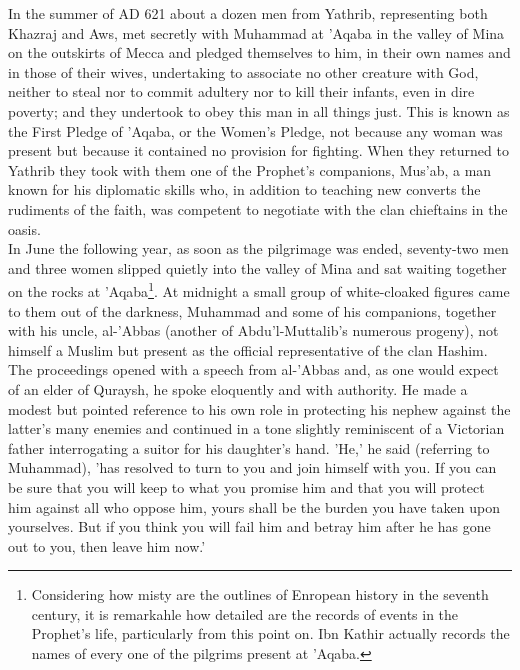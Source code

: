 \documentclass[11pt, b5paper, twoside]{book}
\begin{document}
In the summer of AD 621 about a dozen men from Yathrib, representing both Khazraj and Aws, met 
secretly with Muhammad at 'Aqaba in the valley of Mina on the outskirts of Mecca and pledged 
themselves to him, in their own names and in those of their wives, undertaking to associate no other 
creature with God, neither to steal nor to commit adultery nor to kill their infants, even in dire 
poverty; and they undertook to obey this man in all things just. This is known as the First Pledge of 
'Aqaba, or the Women's Pledge, not because any woman was present but because it contained no 
provision for fighting. When they returned to Yathrib they took with them one of the Prophet's 
companions, Mus'ab, a man known for his diplomatic skills who, in addition to teaching new converts 
the rudiments of the faith, was competent to negotiate with the clan chieftains in the oasis. \\

In June the following year, as soon as the pilgrimage was ended, seventy-two men and three women 
slipped quietly into the valley of Mina and sat waiting together on the rocks at 'Aqaba\footnote{Considering how misty are the outlines of Enropean history in the seventh century, it is remarkahle how detailed are the records of events in the Prophet's life, particularly from this point on. Ibn Kathir actually records the names of every one of the pilgrims present at 'Aqaba.}. At midnight a small group of white-cloaked figures came to them out of the darkness, Muhammad and some of his companions, together with his uncle, al-'Abbas (another of Abdu'l-Muttalib's numerous progeny), not himself a Muslim but present as the official representative of the clan Hashim. The proceedings opened with a speech from al-'Abbas and, as one would expect of an elder of Quraysh, he spoke eloquently and with authority. He made a modest but pointed reference to his own role in protecting his nephew against the latter's many enemies and continued in a tone slightly reminiscent of a Victorian father interrogating a suitor for his daughter's hand. 'He,' he said (referring to Muhammad), 'has resolved to turn to you and join himself with you. If you can be sure that you will keep to what you promise him and that you will protect him against all who oppose him, yours shall be the burden you have taken upon yourselves. But if you think you will fail him and betray him after he has gone out to you, then leave him now.' \\
\end{document}
